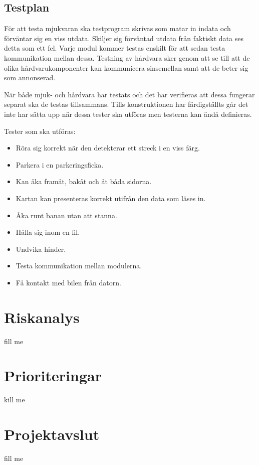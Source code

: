 \documentclass[projektplan/plan.tex]{subfiles}
\begin{document}
\subsection{Testplan}
För att testa mjukvaran ska testprogram skrivas som matar in indata och
förväntar sig en viss utdata. Skiljer sig förväntad utdata från faktiskt data
ses detta som ett fel. Varje modul kommer testas enskilt för att sedan testa
kommunikation mellan dessa. Testning av hårdvara sker genom att se till att de
olika hårdvarukomponenter kan kommunicera sinsemellan samt att de beter sig som
annonserad.

När både mjuk- och hårdvara har testats och det har verifieras att dessa
fungerar separat ska de testas tillsammans. Tills konstruktionen har
färdigställts går det inte har sätta upp när dessa tester ska utföras men
testerna kan ändå definieras.

\vspace{5mm}
\noindent
Tester som ska utföras:
\begin{itemize}
    \item Röra sig korrekt när den detekterar ett streck i en viss färg.
    \item Parkera i en parkeringsficka.
    \item Kan åka framåt, bakåt och åt båda sidorna.
    \item Kartan kan presenteras korrekt utifrån den data som läses in.
    \item Åka runt banan utan att stanna.
    \item Hålla sig inom en fil.
    \item Undvika hinder.
    \item Testa kommunikation mellan modulerna.
    \item Få kontakt med bilen från datorn.
\end{itemize}

\section{Riskanalys}
fill me

\section{Prioriteringar}
kill me

\section{Projektavslut}
fill me
\end{document}
